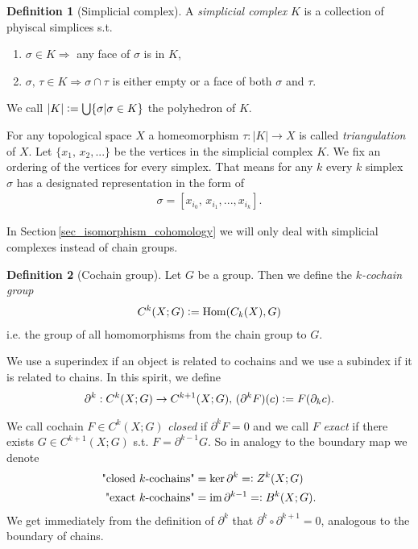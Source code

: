 \documentclass[12pt,a4paper]{article}
\theoremstyle{definition}
\newtheorem{definition}{Definition}
\begin{document}
\begin{definition}[Simplicial complex]
    A \textit{simplicial complex} $K$ is a collection of phyiscal simplices s.t.
    \begin{enumerate}
        \item $\sigma \in K \Rightarrow$ any face of $\sigma$ is in $K$,
        \item $\sigma,\, \tau \in K \Rightarrow \sigma \cap \tau$  
                is either empty or a face of both $\sigma$ and $\tau$.
    \end{enumerate}
    We call $|K| \vcentcolon= \bigcup \{ \sigma | \sigma \in K\}$ 
    the polyhedron of $K$.
\end{definition}
For any topological space $X$ a homeomorphism 
$\tau: |K| \rightarrow X$ is called \textit{triangulation} of $X$.
Let $\{x_1,\, x_2,...\}$ be the vertices in the simplicial complex $K$.
We fix an ordering of the vertices for every simplex. 
That means for any $k$ every $k$ simplex $\sigma$ has
a designated representation in the form of
\begin{align*}
    \sigma = [x_{i_0},\, x_{i_1}, ...,x_{i_k}].
\end{align*} 

In Section\,\ref{sec_isomorphism_cohomology} we will only deal with 
simplicial complexes instead of chain groups.

\begin{definition}[Cochain group]
    Let $G$ be a group. Then we define the \textit{$k$-cochain group} 
    \begin{align*}
        C^k(X;G) \vcentcolon= \text{Hom}(C_k(X),G)
    \end{align*}
    i.e. the group of all homomorphisms from the chain group to $G$.
\end{definition}
\noindent We use a superindex if an object is related to cochains and 
we use a subindex if it is related to chains. In this spirit, we define
\begin{align*}
    \partial^k: C^k(X;G) \rightarrow C^{k+1}(X;G),\, 
    (\partial^k F) (c) \vcentcolon= F(\partial_k c).
\end{align*}

We call  cochain $F \in C^k(X;G)$ \textit{closed} if $\partial^k F = 0$ 
and we call $F$
\textit{exact} if there exists $G \in C^{k+1}(X;G)$ s.t. $F = \partial^{k-1} G$. 
So in analogy to the boundary map we denote
\begin{align*}
    \text{"closed $k$-cochains"} &= \text{ker}\,\partial^k =\vcentcolon 
    Z^k(X;G) \\
    \text{"exact $k$-cochains"} &= \text{im}\,\partial^{k-1} =\vcentcolon 
    B^k(X;G).
\end{align*}
We get immediately from the definition of $\partial^k$ that 
$\partial^k \circ \partial^{k+1} = 0$, analogous to the boundary of chains.
\end{document}

